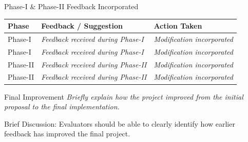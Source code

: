 \documentclass[aspectratio=169,11pt]{beamer}
\newcommand{\smallnote}[1]{%
\vspace{0.08cm}
{\scriptsize\color{GEUGrey}#1}
}
\newcommand{\placeholder}[1]{%
\textit{\color{GEUGrey}#1}
}
\begin{document}
\begin{frame}{Phase-I \& Phase-II Feedback Incorporated}

\scriptsize

\begin{center}

\renewcommand{\arraystretch}{1.35}

\begin{tabularx}{.96\textwidth}
{@{}p{2.1cm}X X@{}}

\toprule
\textbf{Phase} &
\textbf{Feedback / Suggestion} &
\textbf{Action Taken}\\
\midrule

Phase-I &
\placeholder{Feedback received during Phase-I} &
\placeholder{Modification incorporated}\\

Phase-I &
\placeholder{Feedback received during Phase-I} &
\placeholder{Modification incorporated}\\

Phase-II &
\placeholder{Feedback received during Phase-II} &
\placeholder{Modification incorporated}\\

Phase-II &
\placeholder{Feedback received during Phase-II} &
\placeholder{Modification incorporated}\\

\bottomrule

\end{tabularx}

\end{center}

\vfill

\begin{block}{Final Improvement}
\placeholder{
Briefly explain how the project improved from the initial proposal
to the final implementation.
}
\end{block}

\smallnote{
Brief Discussion: Evaluators should be able to clearly identify
how earlier feedback has improved the final project.
}

\end{frame}
\end{document}
